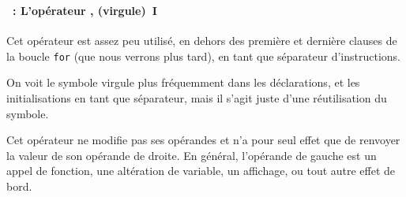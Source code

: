 \begin{frame}[containsverbatim]
  \frametitle{\secname}
  \framesubtitle{\subsecname~: L'opérateur , (virgule)~I} 

  Cet opérateur est assez peu utilisé, en dehors des première et dernière clauses de la boucle \verb|for| (que nous verrons plus tard), en tant 
  que séparateur d'instructions.
  \vspace{0.3cm}
  \par
  On voit le symbole virgule plus fréquemment dans les déclarations, et les initialisations en tant que séparateur, mais il s'agit juste d'une
  réutilisation du symbole.
  \vspace{0.3cm}
  \par
  Cet opérateur ne modifie pas ses opérandes et n'a pour seul effet que de renvoyer la valeur de son opérande de droite. En général, l'opérande
  de gauche est un appel de fonction, une altération de variable, un affichage, ou tout autre effet de bord.
\end{frame}

